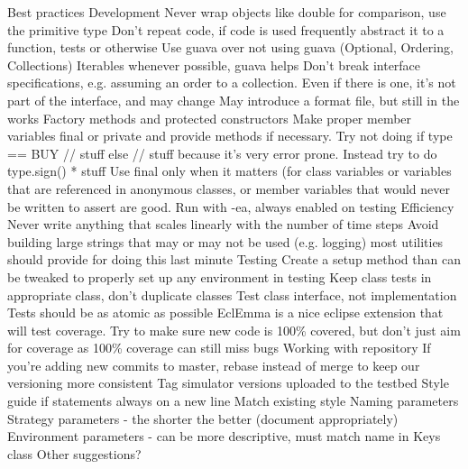 \documentclass{article}
\begin{document}
Best practices
Development
Never wrap objects like double for comparison, use the primitive type
Don’t repeat code, if code is used frequently abstract it to a function, tests
or otherwise
Use guava over not using guava (Optional, Ordering, Collections)
Iterables whenever possible, guava helps
Don’t break interface specifications, e.g. assuming an order to a
collection. Even if there is one, it’s not part of the interface, and may
change
May introduce a format file, but still in the works
Factory methods and protected constructors
Make proper member variables final or private and provide methods if necessary.
Try not doing if type == BUY { // stuff } else { // stuff } because it's very
error prone. Instead try to do type.sign() * stuff
Use final only when it matters (for class variables or variables that are
referenced in anonymous classes, or member variables that would never be
written to
assert are good. Run with -ea, always enabled on testing
Efficiency
Never write anything that scales linearly with the number of time steps
Avoid building large strings that may or may not be used (e.g. logging) most
utilities should provide for doing this last minute
Testing
Create a setup method than can be tweaked to properly set up any environment in
testing
Keep class tests in appropriate class, don’t duplicate classes
Test class interface, not implementation
Tests should be as atomic as possible
EclEmma is a nice eclipse extension that will test coverage. Try to make sure
new code is 100\% covered, but don't just aim for coverage as 100\% coverage can still miss bugs
Working with repository
If you're adding new commits to master, rebase instead of merge to keep our
versioning more consistent
Tag simulator versions uploaded to the testbed
Style guide
if statements always on a new line
Match existing style
Naming parameters
Strategy parameters - the shorter the better (document appropriately)
Environment parameters - can be more descriptive, must match name in Keys class
Other suggestions?
\end{document}
